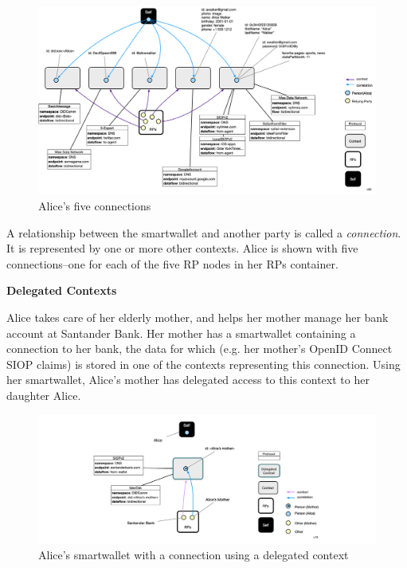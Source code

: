 \documentclass[11pt, oneside]{article}   	%
\begin{document}
\begin{figure}[htbp]
\includegraphics[width=\textwidth]{./images/multiple-connections.png}
\caption{Alice's five connections}
\label{fig:groups}
\end{figure}

A relationship between the smartwallet and another party is called a \emph{connection}. It is represented by one or more other contexts. Alice is shown with five connections--one for each of the five RP nodes in her RPs container. 

\textbf{Delegated Contexts}

Alice takes care of her elderly mother, and helps her mother manage her bank account at Santander Bank. Her mother has a smartwallet containing a connection to her bank, the data for which (e.g. her mother's OpenID Connect SIOP claims) is stored in one of the contexts representing this connection. Using her smartwallet, Alice's mother has delegated access to this context to her daughter Alice.

\begin{figure}[htbp]
\includegraphics[width=\textwidth]{./images/delegated-contexts.png}
\caption{Alice's smartwallet with a connection using a delegated context}
\label{fig:delegated-contexts}
\end{figure}
\end{document}
